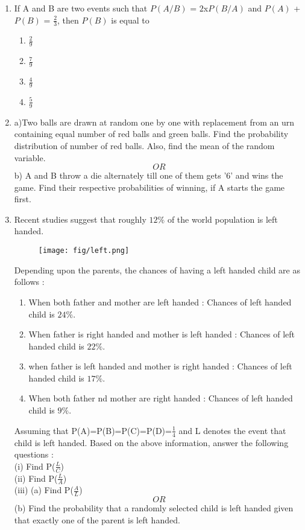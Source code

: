 \documentclass{article}
\begin{document}
\begin{enumerate}
\item If A and B are two events such that $P(A/B)$ = $2  $x$  P(B/A)$ and $P(A)$ + $P(B)$ = $\frac{2}{3}$, then $P(B)$ is equal to
\begin{multicols}{2}
\begin{enumerate}
\item $\frac{2}{9}$
\item $\frac{7}{9}$
\item $\frac{4}{9}$
\item $\frac{5}{9}$
\end{enumerate}
\end{multicols}

\item a)Two balls are drawn at random one by one with replacement from an urn containing equal number of red balls and green balls. Find the probability distribution of number of red balls. Also, find the mean of the random variable.$$OR$$ b) A and B throw a die alternately till one of them gets '6' and wins the game. Find their respective probabilities of winning, if A starts the game first.

\item Recent studies suggest that roughly $12\%$ of the world population is left handed.
	
\begin{figure}[h!]
\centering
\texttt{[image: fig/left.png]}
\end{figure}

Depending upon the parents, the chances of having a left handed child are as follows :\\
\begin{enumerate}
\item   When both father and mother are left handed :
        Chances of left handed child is $24\%$.
\item   When father is right handed and mother is left handed :
        Chances of left handed child is $22\%$.
\item   when father is left handed and mother is right handed :
        Chances of left handed child is $17\%$.
\item   When both father nd mother are right handed :
        Chances of left handed child is $9\%$.
\end{enumerate}
Assuming that P(A)=P(B)=P(C)=P(D)=$\frac{1}{4}$ and L denotes the event that child is left handed.
Based on the above information, answer the following questions :\\
(i)    Find P($\frac{L}{C}$)\\
(ii)   Find P($\frac{\overline{L}}{A}$)\\
(iii)  (a) Find P($\frac{A}{L}$)$$OR$$ (b)  Find the probability that a randomly selected child is left handed given that exactly one of the parent is left handed.\\
\end{enumerate}
\end{document}
